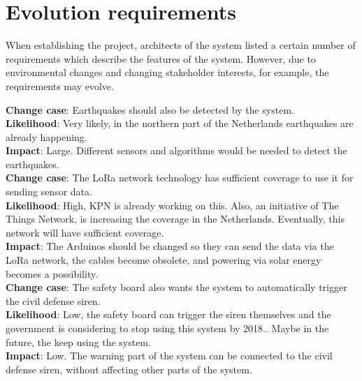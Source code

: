\section{Evolution requirements}


When establishing the project, architects of the system listed a certain number of requirements which describe the features of the system. However, due to environmental changes and changing stakeholder interests, for example, the requirements may evolve.


	
\textbf{Change case}: Earthquakes should also be detected by the system. \\
\textbf{Likelihood}: Very likely, in the northern part of the Netherlands earthquakes are already happening. \\ 
\textbf{Impact}:  Large. Different sensors and algorithms would be needed to detect the earthquakes. \\


\textbf{Change case}: The LoRa network technology has sufficient coverage to use it for sending sensor data. \\
\textbf{Likelihood}: High, KPN is already working on this. Also, an initiative of The Things Network, is increasing the coverage in the Netherlands. Eventually, this network will have sufficient coverage. \\
\textbf{Impact}: The Arduinos should be changed so they can send the data via the LoRa network, the cables become obsolete, and powering via solar energy becomes a possibility. \\


\textbf{Change case}: The safety board also wants the system to automatically trigger the civil defense siren. \\
\textbf{Likelihood}: Low, the safety board can trigger the siren themselves and the government is considering to stop using this system by 2018.\cite{luchtalarm}. Maybe in the future, the keep using the system. \\
\textbf{Impact}: Low. The warning part of the system can be connected to the civil defense siren, without affecting other parts of the system.



